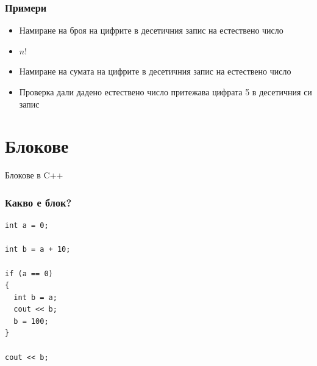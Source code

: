\documentclass{beamer}
\begin{document}
\begin{frame}[fragile]
\frametitle{Примери}

\begin{itemize}
  \item Намиране на броя на цифрите в десетичния запис на естествено число
  \item $n!$
  \item Намиране на сумата на цифрите в десетичния запис на естествено число
  \item Проверка дали дадено естествено число притежава цифрата 5 в десетичния си запис
\end{itemize}

\end{frame}


\section{Блокове} 


\begin{frame}
\centerline{Блокове в C++}
\end{frame}


\begin{frame}[fragile]
\frametitle{Какво е блок?}

\begin{lstlisting}
int a = 0;

int b = a + 10;

if (a == 0)
{
  int b = a;
  cout << b;
  b = 100;
}

cout << b;

\end{lstlisting}



\end{frame}
\end{document}
